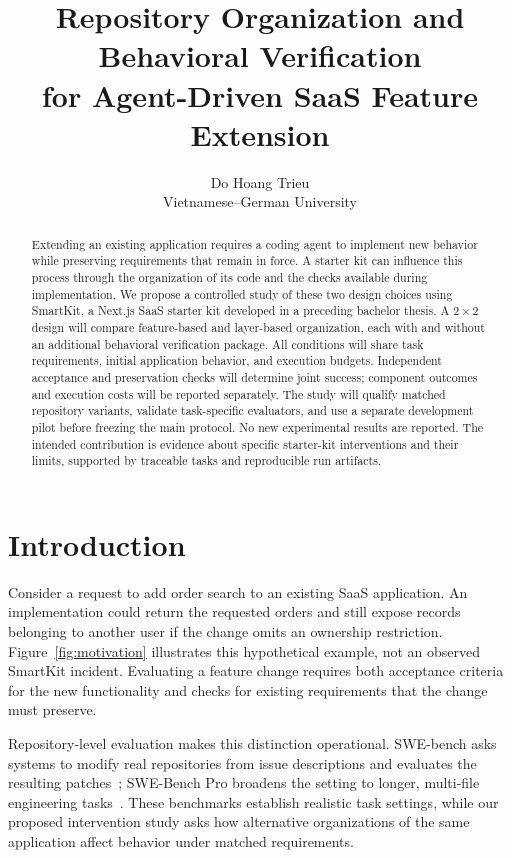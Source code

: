 \documentclass[11pt,a4paper]{article}
\title{Repository Organization and Behavioral Verification\\for Agent-Driven SaaS Feature Extension}
\author{Do Hoang Trieu\\Vietnamese--German University}
\date{}
\begin{document}
\maketitle
\begin{abstract}
Extending an existing application requires a coding agent to implement new behavior while preserving requirements that remain in force. A starter kit can influence this process through the organization of its code and the checks available during implementation. We propose a controlled study of these two design choices using SmartKit, a Next.js SaaS starter kit developed in a preceding bachelor thesis. A $2\times2$ design will compare feature-based and layer-based organization, each with and without an additional behavioral verification package. All conditions will share task requirements, initial application behavior, and execution budgets. Independent acceptance and preservation checks will determine joint success; component outcomes and execution costs will be reported separately. The study will qualify matched repository variants, validate task-specific evaluators, and use a separate development pilot before freezing the main protocol. No new experimental results are reported. The intended contribution is evidence about specific starter-kit interventions and their limits, supported by traceable tasks and reproducible run artifacts.
\end{abstract}

\section{Introduction}
Consider a request to add order search to an existing SaaS application. An implementation could return the requested orders and still expose records belonging to another user if the change omits an ownership restriction. Figure~\ref{fig:motivation} illustrates this hypothetical example, not an observed SmartKit incident. Evaluating a feature change requires both acceptance criteria for the new functionality and checks for existing requirements that the change must preserve.



Repository-level evaluation makes this distinction operational. SWE-bench asks systems to modify real repositories from issue descriptions and evaluates the resulting patches~\cite{jimenez2024swebench}; SWE-Bench Pro broadens the setting to longer, multi-file engineering tasks~\cite{deng2025swepro}. These benchmarks establish realistic task settings, while our proposed intervention study asks how alternative organizations of the same application affect behavior under matched requirements.
\end{document}
